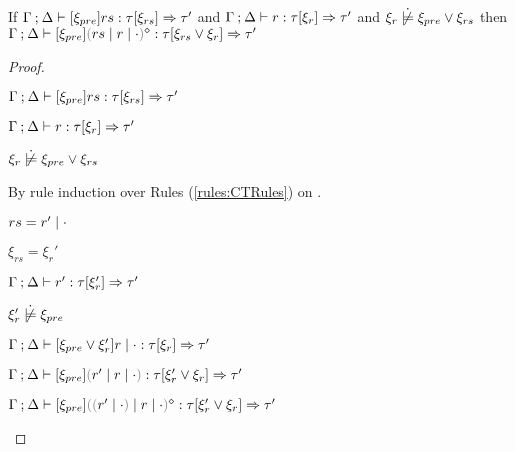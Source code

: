 \begin{lemma}
  \label{lem:rule-append}
  If $\Gamma \mathbin{;} \Delta \vdash [\xi_{pre}] rs : \tau [\xi_{rs}] \Rightarrow \tau'$ and $\Gamma \mathbin{;} \Delta \vdash r : \tau [\xi_r] \Rightarrow \tau'$ and $\cnotsatisfy{\xi_r}{\cor{\xi_{pre}}{\xi_{rs}}}$ then $\chrulstyp{\Gamma}{\Delta}{\xi_{pre}}{\rmpointer{\zruls{rs}{r}{\cdot}}}{\tau}{\cor{\xi_{rs}}{\xi_r}}{\tau'}$
\end{lemma}
\begin{proof}
  \begin{pfsteps*}
  \item $\Gamma \mathbin{;} \Delta \vdash [\xi_{pre}] rs : \tau [\xi_{rs}] \Rightarrow \tau'$  
  \item $\Gamma \mathbin{;} \Delta \vdash r : \tau [\xi_r] \Rightarrow \tau'$  
  \item $\cnotsatisfy{\xi_r}{\cor{\xi_{pre}}{\xi_{rs}}}$  
  \end{pfsteps*}
  By rule induction over Rules (\ref{rules:CTRules}) on .
  \begin{byCases}
    
  \item[\text{(\ref{rule:CTOneRules})}]
    \begin{pfsteps*}
    \item $rs = r' \mid \cdot$ 
    \item $\xi_{rs} = \xi_r'$ 
    \item $\Gamma \mathbin{;} \Delta \vdash r' : \tau [\xi_r'] \Rightarrow \tau'$  
    \item $\cnotsatisfy{\xi_r'}{\xi_{pre}}$  
    \item $\Gamma \mathbin{;} \Delta \vdash [\xi_{pre} \vee \xi_r'] r \mid \cdot : \tau [\xi_r] \Rightarrow \tau'$  
    \item $\chrulstyp{\Gamma}{\Delta}{\xi_{pre}}{\hrulesP{r'}{\hrules{r}{\cdot}}}{\tau}{\cor{\xi_r'}{\xi_r}}{\tau'}$  
    \item $\chrulstyp{\Gamma}{\Delta}{\xi_{pre}}{\rmpointer{\zruls{\hrulesP{r'}{\cdot}}{r}{\cdot}}}{\tau}{\cor{\xi_r'}{\xi_r}}{\tau'}$ 
    \end{pfsteps*}


\end{byCases}
\end{proof}
